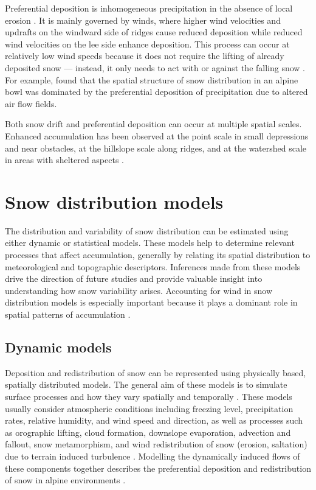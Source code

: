 \documentclass{sfuthesis}
\begin{document}
Preferential deposition is inhomogeneous precipitation in the absence of local erosion \citep{Lehning2008}. It is mainly governed by winds, where higher wind velocities and updrafts on the windward side of ridges cause reduced deposition while reduced wind velocities on the lee side enhance deposition. This process can occur at relatively low wind speeds because it does not require the lifting of already deposited snow  --- instead, it only needs to act with or against the falling snow \citep{Mott2008, Dadic2010}. For example, \cite{Mott2011} found that the spatial structure of snow distribution in an alpine bowl was dominated by the preferential deposition of precipitation due to altered air flow fields. 

Both snow drift and preferential deposition can occur at multiple spatial scales. Enhanced accumulation has been observed at the point scale in small depressions and near obstacles, at the hillslope scale along ridges, and at the watershed scale in areas with sheltered aspects \citep{Harrison1986, Bloeschl1992, Mott2008, Winstral2002, Clark2011}. 

\section{Snow distribution models}
The distribution and variability of snow distribution can be estimated using either dynamic or statistical models. These models help to determine relevant processes that affect accumulation, generally by relating its spatial distribution to meteorological and topographic descriptors. Inferences made from these models drive the direction of future studies and provide valuable insight into understanding how snow variability arises. Accounting for wind in snow distribution models is especially important because it plays a dominant role in spatial patterns of accumulation \citep{Winstral2013}.

\subsection{Dynamic models}
Deposition and redistribution of snow can be represented using physically based, spatially distributed models. The general aim of these models is to simulate surface processes and how they vary spatially and temporally \citep{Mott2008}. These models usually consider atmospheric conditions including freezing level, precipitation rates, relative humidity, and wind speed and direction, as well as processes such as orographic lifting, cloud formation, downslope evaporation, advection and fallout, snow metamorphism, and wind redistribution of snow (erosion, saltation) due to terrain induced turbulence \citep{Smith2004, Liston2006, Lehning2008, Mott2008}.  Modelling the dynamically induced flows of these components together describes the preferential deposition and redistribution of snow in alpine environments \citep{Lehning2008,Mott2008,Dadic2010}.
\end{document}
